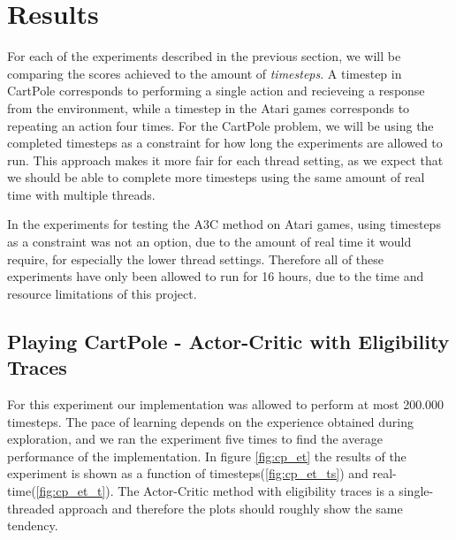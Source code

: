 \documentclass[11pt]{article}
\begin{document}
\section{Results}

For each of the experiments described in the previous section, we will be comparing the
scores achieved to the amount of \textit{timesteps}. 
A timestep in CartPole corresponds to performing a single action and recieveing a response
from the environment, while a timestep in the Atari games corresponds to repeating an action
four times.
For the CartPole problem, we will be using the completed timesteps as a constraint for
how long the experiments are allowed to run.
This approach makes it more fair for each thread setting, as we expect 
that we should be able to complete more timesteps using the same amount of real time
with multiple threads.

In the experiments for testing the A3C method on Atari games, using timesteps as a constraint
was not an option, due to the amount of real time it would require, for especially the lower thread settings.
Therefore all of these experiments have only been allowed to run for 16 hours,
due to the time and resource limitations of this project.

\subsection{Playing CartPole - Actor-Critic with Eligibility Traces}

For this experiment our implementation was allowed to perform at most 200.000 timesteps.
The pace of learning depends on the experience obtained during exploration,
and we ran the experiment five times to find the average performance of
the implementation.
In figure \ref{fig:cp_et} the results of the experiment is shown
as a function of timesteps(\ref{fig:cp_et_ts}) and real-time(\ref{fig:cp_et_t}).
The Actor-Critic method with eligibility traces is a single-threaded
approach and therefore the plots should roughly show the same tendency.
\end{document}
